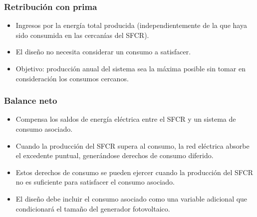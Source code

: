 \documentclass[serif, xcolor=dvipsnames]{beamer}
\begin{document}
\begin{frame}
  \frametitle{Retribución con prima}
  \begin{itemize}
  \item Ingresos por la energía total producida (independientemente de
    la que haya sido consumida en las cercanías del SFCR).
  \item El diseño no necesita considerar un consumo a satisfacer.
  \item Objetivo: producción anual del sistema sea la máxima posible
    sin tomar en consideración los consumos cercanos.
  \end{itemize}
\end{frame}

\begin{frame}
  \frametitle{Balance neto}
  \begin{itemize}
  \item Compensa los saldos de energía eléctrica entre el SFCR y un
    sistema de consumo asociado.
  \item Cuando la producción del SFCR supera al consumo, la red
    eléctrica absorbe el excedente puntual, generándose derechos de
    consumo diferido.
  \item Estos derechos de consumo se pueden ejercer cuando la
    producción del SFCR no es suficiente para satisfacer el consumo
    asociado.
  \item El diseño debe incluir el consumo asociado como una variable
    adicional que condicionará el tamaño del generador fotovoltaico.

  \end{itemize}
\end{frame}


\end{document}
